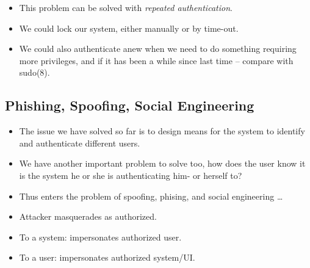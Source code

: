 \begin{frame}
  \begin{solution}
    \begin{itemize}
      \item This problem can be solved with \emph{repeated authentication}.

      \item We could lock our system, either manually or by time-out.

      \item We could also authenticate anew when we need to do something 
        requiring more privileges, and if it has been a while since last time -- 
        compare with sudo(8).
    \end{itemize}
  \end{solution}
\end{frame}

\subsection{Phishing, Spoofing, Social Engineering}

\begin{frame}
  \begin{remark}
    \begin{itemize}
      \item The issue we have solved so far is to design means for the system to 
        identify and authenticate different users.

      \item We have another important problem to solve too, how does the user 
        know it is the system he or she is authenticating him- or herself to?

      \item Thus enters the problem of spoofing, phising, and social engineering 
        \dots
    \end{itemize}
  \end{remark}
\end{frame}

\begin{frame}
  \begin{definition}
    \begin{itemize}
      \item Attacker masquerades as authorized.
      \item To a system: impersonates authorized user.
      \item To a user: impersonates authorized system/UI.
    \end{itemize}
  \end{definition}
\end{frame}

